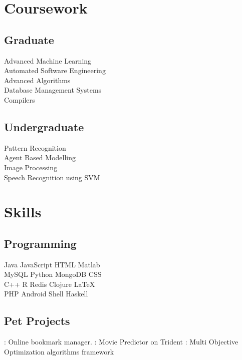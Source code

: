 \documentclass[]{bigfatnoob-resume}
\begin{document}
\begin{minipage}[t]{0.33\textwidth}

\section{Coursework}
\subsection{Graduate}
Advanced Machine Learning \\
Automated Software Engineering \\
Advanced Algorithms \\
Database Management Systems \\
Compilers \\


\sectionsep

\subsection{Undergraduate}
Pattern Recognition \\
Agent Based Modelling \\
Image Processing \\
Speech Recognition using SVM\\
\sectionsep


\section{Skills}
\subsection{Programming}
Java \textbullet{} JavaScript\textbullet{} HTML \textbullet{} Matlab \\
MySQL \textbullet{} Python \textbullet{} MongoDB \textbullet{} CSS \\ 
C++ \textbullet{} R \textbullet{} Redis \textbullet{} Clojure \textbullet{} \LaTeX\ \\
PHP \textbullet{} Android \textbullet{} Shell \textbullet{} Haskell
\sectionsep

\subsection{Pet Projects}
\href{http://region.io}{}: Online bookmark manager.
\href{https://github.com/NCSU-Advanced-Algos/octorater}{}: Movie Predictor on Trident
\href{https://github.com/bigfatnoob/optima}{}: Multi Objective Optimization algorithms framework

%
%

\end{minipage} 
\end{document}

